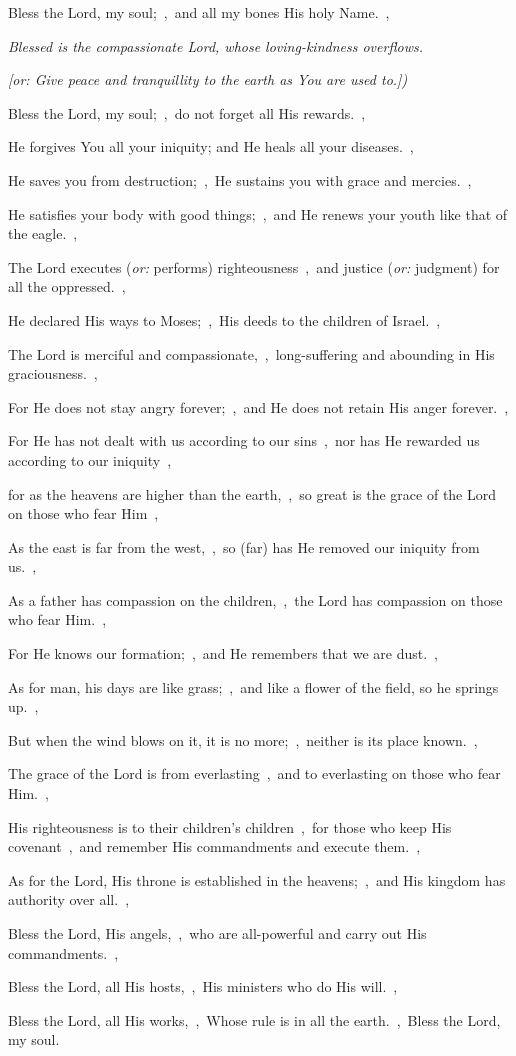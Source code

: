 \documentclass[12pt,twoside,a5paper]{article}
\newcommand{\qanona}[1]{{\liturgicalhint{Qanona.} \emph{#1}}}
\newcommand{\translationoption}[1]{\emph{or:} #1}
\begin{document}
\begin{normalparskip}
  Bless the Lord, my soul;~\sep\ and all my bones His holy Name.~\sep

  \qanona{Blessed is the compassionate Lord, whose loving-kindness overflows.}

  \emph{[or: Give peace and tranquillity to the earth as You are used to.])}

  Bless the Lord, my soul;~\sep\ do not forget all His rewards.~\sep

  He forgives You all your iniquity; and He heals all your diseases.~\sep

  He saves you from destruction;~\sep\ He sustains you with grace and mercies.~\sep

  He satisfies your body with good things;~\sep\ and He renews your youth like that of the eagle.~\sep

  The Lord executes (\translationoption{performs}) righteousness~\sep\ and justice (\translationoption{judgment}) for all the oppressed.~\sep

  He declared His ways to Moses;~\sep\ His deeds to the children of Israel.~\sep

  The Lord is merciful and compassionate,~\sep\ long-suffering and abounding in His graciousness.~\sep

  For He does not stay angry forever;~\sep\ and He does not retain His anger forever.~\sep

  For He has not dealt with us according to our sins~\sep\ nor has He rewarded us according to our iniquity~\sep

  for as the heavens are higher than the earth,~\sep\ so great is the grace of the Lord on those who fear Him~\sep

  As the east is far from the west,~\sep\ so (far) has He removed our iniquity from us.~\sep

  As a father has compassion on the children,~\sep\ the Lord has compassion on those who fear Him.~\sep

  For He knows our formation;~\sep\ and He remembers that we are dust.~\sep

  As for man, his days are like grass;~\sep\ and like a flower of the field, so he springs up.~\sep

  But when the wind blows on it, it is no more;~\sep\ neither is its place known.~\sep

  The grace of the Lord is from everlasting~\sep\ and to everlasting on those who fear Him.~\sep

  His righteousness is to their children's children~\sep\ for those who keep His covenant~\sep\ and remember His commandments and execute them.~\sep

  As for the Lord, His throne is established in the heavens;~\sep\ and His kingdom has authority over all.~\sep

  Bless the Lord, His angels,~\sep\ who are all-powerful and carry out His commandments.~\sep

  Bless the Lord, all His hosts,~\sep\ His ministers who do His will.~\sep

  Bless the Lord, all His works,~\sep\ Whose rule is in all the earth.~\sep\ Bless the Lord, my soul.
\end{normalparskip}
\end{document}
